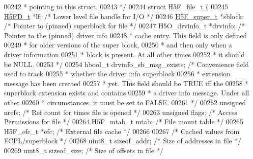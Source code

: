 \begin{DoxyCode}
00242 \textcolor{comment}{ * pointing to this struct.}
00243 \textcolor{comment}{ */}
00244 \textcolor{keyword}{struct }\hyperlink{struct_h5_f__file__t}{H5F\_file\_t} \{
00245     \hyperlink{struct_h5_f_d__t}{H5FD\_t}    *lf;        \textcolor{comment}{/* Lower level file handle for I/O  */}
00246     \hyperlink{struct_h5_f__super__t}{H5F\_super\_t} *sblock;        \textcolor{comment}{/* Pointer to (pinned) superblock for file */}
00247     H5O\_drvinfo\_t *drvinfo; \textcolor{comment}{/* Pointer to the (pinned) driver info }
00248 \textcolor{comment}{                                 * cache entry.  This field is only defined}
00249 \textcolor{comment}{                                 * for older versions of the super block,}
00250 \textcolor{comment}{                                 * and then only when a driver information}
00251 \textcolor{comment}{                                 * block is present.  At all other times}
00252 \textcolor{comment}{                                 * it should be NULL.}
00253 \textcolor{comment}{                                 */}
00254     hbool\_t drvinfo\_sb\_msg\_exists;  \textcolor{comment}{/* Convenience field used to track }
00255 \textcolor{comment}{                                     * whether the driver info superblock }
00256 \textcolor{comment}{                                     * extension message has been created }
00257 \textcolor{comment}{                                     * yet. This field should be TRUE iff the}
00258 \textcolor{comment}{                                     * superblock extension exists and contains}
00259 \textcolor{comment}{                                     * a driver info message.  Under all other}
00260 \textcolor{comment}{                                     * circumstances, it must be set to FALSE.}
00261 \textcolor{comment}{                                     */}
00262     \textcolor{keywordtype}{unsigned}    nrefs;      \textcolor{comment}{/* Ref count for times file is opened   */}
00263     \textcolor{keywordtype}{unsigned}    flags;      \textcolor{comment}{/* Access Permissions for file          */}
00264     \hyperlink{struct_h5_f__mtab__t}{H5F\_mtab\_t}    mtab;       \textcolor{comment}{/* File mount table                     */}
00265     H5F\_efc\_t   *efc;           \textcolor{comment}{/* External file cache                  */}
00266 
00267     \textcolor{comment}{/* Cached values from FCPL/superblock */}
00268     uint8\_t sizeof\_addr;    \textcolor{comment}{/* Size of addresses in file            */}
00269     uint8\_t sizeof\_size;    \textcolor{comment}{/* Size of offsets in file              */}

\end{DoxyCode}
